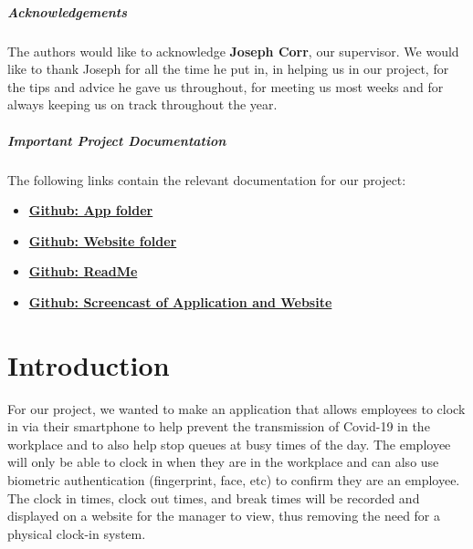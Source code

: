 \paragraph{Acknowledgements \\}
The authors would like to acknowledge \textbf{Joseph Corr}, our supervisor. We would like to thank Joseph for all the time he put in, in helping us in our project, for the tips and advice he gave us throughout, for meeting us most weeks and for always keeping us on track throughout the year.
\\



\paragraph{Important Project Documentation \\}
The following links contain the relevant documentation for our project:
\begin{itemize}
  \item \textbf{\href{https://github.com/ryanhiggins11/FINAL-YEAR-PROJECT/tree/master/kotlin-app}{Github: App folder}}
  \item \textbf{\href{https://github.com/ryanhiggins11/FINAL-YEAR-PROJECT/tree/master/ManagerWebsite}{Github: Website folder}}
  \item \textbf{\href{https://github.com/ryanhiggins11/FINAL-YEAR-PROJECT/blob/master/README.md}{Github: ReadMe}}
  \item \textbf{\href{https://github.com/ryanhiggins11/FINAL-YEAR-PROJECT/blob/master/Screencast.mp4}{Github: Screencast of Application and Website}}
\end{itemize}


\chapter{Introduction}
For our project, we wanted to make an application that allows employees to clock in via their smartphone to help prevent the transmission of Covid-19 in the workplace and to also help stop queues at busy times of the day. The employee will only be able to clock in when they are in the workplace and can also use biometric authentication (fingerprint, face, etc) to confirm they are an employee. The clock in times, clock out times, and break times will be recorded and displayed on a website for the manager to view, thus removing the need for a physical clock-in system.

